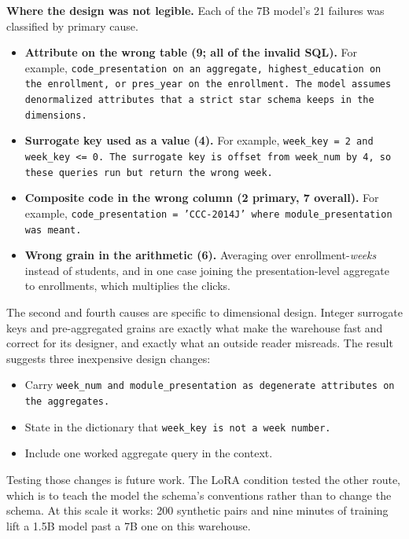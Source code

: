 \textbf{Where the design was not legible.} Each of the 7B model's 21 failures was classified by primary cause.
\begin{itemize}
\item \textbf{Attribute on the wrong table (9; all of the invalid SQL).} For example, \tt{code\_presentation} on
an aggregate, \tt{highest\_education} on the enrollment, or \tt{pres\_year} on the enrollment. The model assumes
denormalized attributes that a strict star schema keeps in the dimensions.
\item \textbf{Surrogate key used as a value (4).} For example, \tt{week\_key = 2} and \tt{week\_key <= 0}. The
surrogate key is offset from \tt{week\_num} by 4, so these queries run but return the wrong week.
\item \textbf{Composite code in the wrong column (2 primary, 7 overall).} For example,
\tt{code\_presentation = 'CCC-2014J'} where \tt{module\_presentation} was meant.
\item \textbf{Wrong grain in the arithmetic (6).} Averaging over enrollment-\emph{weeks} instead of students, and
in one case joining the presentation-level aggregate to enrollments, which multiplies the clicks.
\end{itemize}
The second and fourth causes are specific to dimensional design. Integer surrogate keys and pre-aggregated grains
are exactly what make the warehouse fast and correct for its designer, and exactly what an outside reader
misreads. The result suggests three inexpensive design changes:
\begin{itemize}
\item Carry \tt{week\_num} and \tt{module\_presentation} as degenerate attributes on the aggregates.
\item State in the dictionary that \tt{week\_key} is not a week number.
\item Include one worked aggregate query in the context.
\end{itemize}
Testing those changes is future work. The LoRA condition tested the other route, which is to teach the model
the schema's conventions rather than to change the schema. At this scale it works: 200 synthetic pairs and nine
minutes of training lift a 1.5B model past a 7B one on this warehouse.
